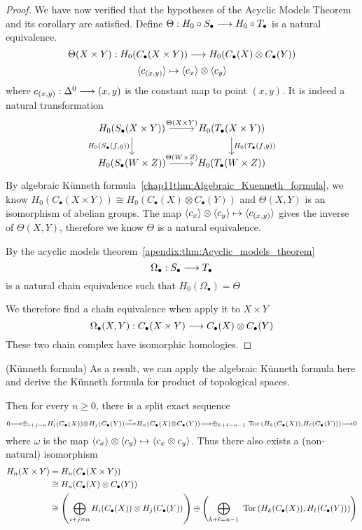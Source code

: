 \documentclass[11pt]{book} %
\begin{document}
\begin{proposition}
\begin{proof}
We have now verified that the hypotheses of the Acyclic Models Theorem and
its corollary are satisfied.
Define  
$\Theta:H_0\circ S_\bullet\longrightarrow H_0\circ T_\bullet$ is a natural equivalence.
$$
\Theta(X\times Y):H_0(C_\bullet(X\times Y))\longrightarrow H_0(C_\bullet(X)\otimes C_\bullet (Y))
$$
$$
\langle c_{(x,y)}\rangle\mapsto \langle c_x\rangle\otimes\langle c_y\rangle
$$
where $c_{(x,y)}:\Delta^0\longrightarrow (x,y)$ is the constant map to point $(x,y)$. It is indeed a natural transformation
\[
\begin{tikzcd}
H_0(S_\bullet(X\times Y)) \arrow[d, "{H_0(S_\bullet(f,g))}"'] \arrow[r, "\Theta(X\times Y)"] & H_0(T_\bullet(X\times Y)) \arrow[d, "{H_0(T_\bullet(f, g))}"] \\
H_0(S_\bullet(W\times Z)) \arrow[r, "\Theta(W\times Z)"] & H_0(T_\bullet(W\times Z))
\end{tikzcd}
\]
By algebraic K\"unneth formula~\ref{chap11thm:Algebraic_Kuenneth_formula}, we know $H_0(C_\bullet(X\times Y))\cong H_0(C_\bullet(X)\otimes C_\bullet (Y))$ and $\Theta(X,Y)$ is an isomorphism of abelian groups.
The map $ \langle c_x\rangle\otimes\langle c_y\rangle\mapsto \langle c_{(x,y)}\rangle$ gives the inverse of $\Theta(X,Y)$, therefore we know $\Theta$ is a natural equivalence.

By the acyclic models theorem~\ref{apendix:thm:Acyclic_models_theorem}
$$
\Omega_\bullet: S_\bullet\longrightarrow T_\bullet
$$
 is a natural chain equivalence such that $H_0(\Omega_\bullet)=\Theta$

 We therefore find a chain equivalence when apply it to $X\times Y$
 $$
\Omega_\bullet(X,Y):C_\bullet(X\times Y)\longrightarrow C_\bullet(X)\otimes C_\bullet(Y)
 $$
 These two chain complex have isomorphic homologies.
\end{proof}
\begin{corollary}(K\"unneth formula)
As a result, we can apply the algebraic K\"unneth formula here and derive the K\"unneth formula for product of topological spaces.

Then for every $n\geq 0$, there is a split exact sequence
$$
{\scriptstyle
0\longrightarrow \oplus_{i+j=n}H_i(C_\bullet(X))\otimes H_j(C_\bullet(Y))\overset{\omega}{\longrightarrow} H_n(C_\bullet(X)\otimes C_\bullet(Y))\longrightarrow \oplus_{k+\ell=n-1}\text{ Tor\,}(H_k(C_\bullet(X)),H_\ell(C_\bullet(Y)))\longrightarrow 0}
$$
where $\omega$ is the map $\langle c_x\rangle\otimes \langle c_y\rangle\mapsto \langle c_x\otimes c_y\rangle$. 
Thus there also exists a (non-natural) isomorphism 
$$
\begin{aligned}
H_n(X\times Y)&=H_n(C_\bullet(X\times Y))\\
&\cong H_n(C_\bullet(X)\otimes C_\bullet(Y))\\
&\cong \left(\bigoplus_{i+j=n}H_i(C_\bullet(X))\otimes H_j (C_\bullet(Y))\right)\oplus\left(\bigoplus_{k+\ell=n-1} \text{ Tor\,}(H_k(C_\bullet(X)),H_\ell(C_\bullet(Y)))\right)
\end{aligned}
$$


\end{corollary}
\end{proposition}
\end{document}
